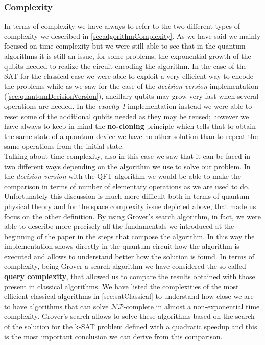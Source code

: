 \documentclass[english]{article}
\begin{document}
			\subsubsection{Complexity}
			\label{sec:complexityComparison}
				In terms of complexity we have always to refer to the two different types of complexity we described in \ref{sec:algorithmComplexity}. As we have said we mainly focused on time complexity but we were still able to see that in the quantum algorithms it is still an issue, for some problems, the exponential growth of the qubits needed to realize the circuit encoding the algorithm. In the case of the SAT for the classical case we were able to exploit a very efficient way to encode the problems while as we saw for the case of the \emph{decision version} implementation (\ref{sec:quantumDecisionVersion}), ancillary qubits may grow very fast when several operations are needed. In the \emph{exaclty-1} implementation instead we were able to reset some of the additional qubits needed as they may be reused; however we have always to keep in mind the \textbf{no-cloning} principle which tells that to obtain the same state of a quantum device we have no other solution than to repeat the same operations from the initial state. \\
				
				Talking about time complexity, also in this case we saw that it can be faced in two different ways depending on the algorithm we use to solve our problem. In the \emph{decision version} with the QFT algorithm we would be able to make the comparison in terms of number of elementary operations as we are used to do. Unfortunately this discussion is much more difficult both in terms of quantum physical theory and for the space complexity issue depicted above, that made us focus on the other definition. By using Grover's search algorithm, in fact, we were able to describe more precisely all the fundamentals we introduced at the beginning of the paper in the steps that compose the algorithm. In this way the implementation shows directly in the quantum circuit how the algorithm is executed and allows to understand better how the solution is found. In terms of complexity, being Grover a search algorithm we have considered the so called \textbf{query complexity}, that allowed us to compare the results obtained with those present in classical algorithms. We have listed the complexities of the most efficient classical algorithms in \ref{sec:satClassical} to understand how close we are to have algorithms that can solve $\mathcal{N}\mathcal{P}$-complete in almost a non-exponential time complexity. Grover's search allows to solve these algorithms based on the search of the solution for the k-SAT problem defined with a quadratic speedup and this is the most important conclusion we can derive from this comparison. \\
				
\end{document}
